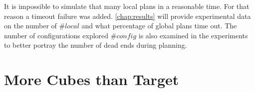 It is impossible to simulate that many local plans in a reasonable time.
For that reason a timeout failure was added.
\autoref{chap:results} will provide experimental data on the number of $\#local$ and what percentage of global plans time out.
The number of configurations explored $\#config$ is also examined in the experiments to better portray the number of dead ends during planning.





\section{More Cubes than Target}
\label{sec:more_cubes}

